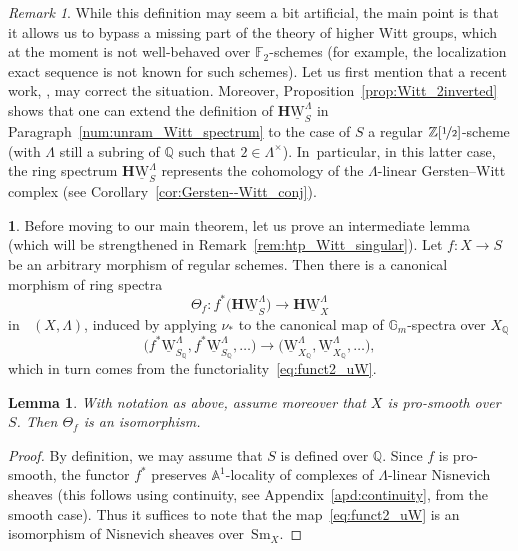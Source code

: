 \documentclass[JEP,XML,SOM,Unicode]{cedram}
\renewcommand{\AA}{\mathbb A}
\newcommand{\uW}{\underline{\mathrm W}}
\newcommand{\HuW}{\mathbf H \underline{\mathrm W}}
\newcommand{\sm}{\mathrm{Sm}}
\DeclareMathOperator{\DA}{D_{\AA^1}}
\newcommand{\ZZot} {\mathbb Z[\nicefrac 1 2]}
\newcommand{\QQ} {\mathbb Q}
\newcommand{\GG} {\mathbb{G}_m}
\newtheorem{lm}[thm]{Lemma}
\theoremstyle{remark}
\newtheorem{rem}[thm]{Remark}
\theoremstyle{definition}
\newtheorem{num}[thm]{}
\numberwithin{equation}{thm}
\begin{document}
\begin{rem}\label{rem:justif_df_uW}
While this definition may seem a bit artificial, the main point is that it allows us to bypass a missing part of the theory of higher Witt groups,
which at the moment is not well-behaved over $\mathbb F_2$-schemes
(for example, the localization exact sequence is not known for such schemes).
Let us first mention that a recent work, \cite{realK1,realK2,realK3}, may correct the situation.
Moreover, Proposition~\ref{prop:Witt_2inverted} shows that
one can extend the definition of $\HuW_S^\Lambda$ in Paragraph~\ref{num:unram_Witt_spectrum}
to the case of $S$ a regular $\ZZot$-scheme (with $\Lambda$ still a subring of $\QQ$ such that $2 \in \Lambda^\times$).
In~particular, in this latter case, the ring spectrum $\HuW_S^\Lambda$
represents the cohomology of the $\Lambda$-linear Gersten--Witt complex
(see Corollary~\ref{cor:Gersten--Witt_conj}).
\end{rem}

\begin{num}
Before moving to our main theorem, let us prove an intermediate lemma
(which will be strengthened in Remark~\ref{rem:htp_Witt_singular}).
Let $f:X \to S$ be an arbitrary morphism of regular schemes.
Then there is a canonical morphism of ring spectra
\[
\Theta_f:f^*\big(\HuW^\Lambda_S\big) \to \HuW^\Lambda_X
\]
in $\DA(X,\Lambda)$, induced by applying $\nu_*$ to the canonical map of $\GG$-spectra over $X_\QQ$
\[
\big(f^*\uW^\Lambda_{S_\QQ},f^*\uW^\Lambda_{S_\QQ},\hdots\big)
\to \big(\uW^\Lambda_{X_\QQ},\uW^\Lambda_{X_\QQ},\hdots\big),
\]
which in turn comes from the functoriality~\eqref{eq:funct2_uW}.
\end{num}
\begin{lm}\label{lm:W commutes with p^*}
With notation as above, assume moreover that $X$ is pro-smooth over~$S$.
Then $\Theta_f$ is an isomorphism.
\end{lm}
\begin{proof}
By definition, we may assume that $S$ is defined over $\QQ$.
Since $f$ is pro-smooth, the functor $f^*$ preserves $\AA^1$-locality of complexes of $\Lambda$-linear Nisnevich sheaves (this follows using continuity, see Appendix~\ref{apd:continuity}, from the smooth case).
Thus it suffices to note that the map~\eqref{eq:funct2_uW} is an isomorphism
of Nisnevich sheaves over~$\sm_X$.
\end{proof}
\end{document}
